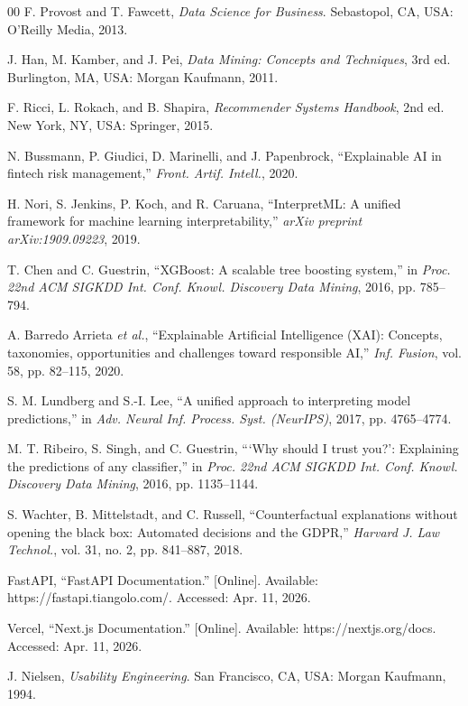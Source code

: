\documentclass[journal]{./IEEE/IEEEtran}
\begin{document}
\begin{thebibliography}{00}
 F. Provost and T. Fawcett, \emph{Data Science for Business}. Sebastopol, CA, USA: O'Reilly Media, 2013.

 J. Han, M. Kamber, and J. Pei, \emph{Data Mining: Concepts and Techniques}, 3rd ed. Burlington, MA, USA: Morgan Kaufmann, 2011.

 F. Ricci, L. Rokach, and B. Shapira, \emph{Recommender Systems Handbook}, 2nd ed. New York, NY, USA: Springer, 2015.

 N. Bussmann, P. Giudici, D. Marinelli, and J. Papenbrock, ``Explainable AI in fintech risk management,'' \emph{Front. Artif. Intell.}, 2020.

 H. Nori, S. Jenkins, P. Koch, and R. Caruana, ``InterpretML: A unified framework for machine learning interpretability,'' \emph{arXiv preprint arXiv:1909.09223}, 2019.

 T. Chen and C. Guestrin, ``XGBoost: A scalable tree boosting system,'' in \emph{Proc. 22nd ACM SIGKDD Int. Conf. Knowl. Discovery Data Mining}, 2016, pp. 785--794.

 A. Barredo Arrieta \emph{et al.}, ``Explainable Artificial Intelligence (XAI): Concepts, taxonomies, opportunities and challenges toward responsible AI,'' \emph{Inf. Fusion}, vol. 58, pp. 82--115, 2020.

 S. M. Lundberg and S.-I. Lee, ``A unified approach to interpreting model predictions,'' in \emph{Adv. Neural Inf. Process. Syst. (NeurIPS)}, 2017, pp. 4765--4774.

 M. T. Ribeiro, S. Singh, and C. Guestrin, ```Why should I trust you?': Explaining the predictions of any classifier,'' in \emph{Proc. 22nd ACM SIGKDD Int. Conf. Knowl. Discovery Data Mining}, 2016, pp. 1135--1144.

 S. Wachter, B. Mittelstadt, and C. Russell, ``Counterfactual explanations without opening the black box: Automated decisions and the GDPR,'' \emph{Harvard J. Law Technol.}, vol. 31, no. 2, pp. 841--887, 2018.

 FastAPI, ``FastAPI Documentation.'' [Online]. Available: https://fastapi.tiangolo.com/. Accessed: Apr. 11, 2026.

 Vercel, ``Next.js Documentation.'' [Online]. Available: https://nextjs.org/docs. Accessed: Apr. 11, 2026.

 J. Nielsen, \emph{Usability Engineering}. San Francisco, CA, USA: Morgan Kaufmann, 1994.


\end{thebibliography}
\end{document}
